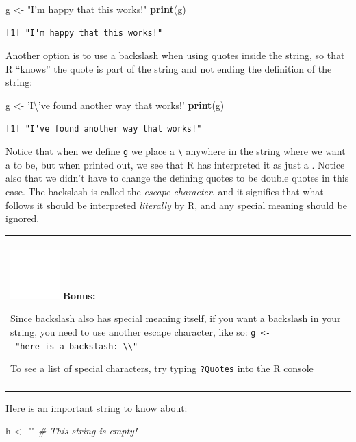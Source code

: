 \documentclass[
]{book}
\newenvironment{Shaded}{\begin{snugshade}}{\end{snugshade}}
\newcommand{\CharTok}[1]{\textcolor[rgb]{0.31,0.60,0.02}{#1}}
\newcommand{\CommentTok}[1]{\textcolor[rgb]{0.56,0.35,0.01}{\textit{#1}}}
\newcommand{\KeywordTok}[1]{\textcolor[rgb]{0.13,0.29,0.53}{\textbf{#1}}}
\newcommand{\NormalTok}[1]{#1}
\newcommand{\StringTok}[1]{\textcolor[rgb]{0.31,0.60,0.02}{#1}}
\newenvironment{bonus}
{
  \begin{center}
  \begin{tabular}{|>{\columncolor{bonus}\color{white}}p{0.9\textwidth}|}\hline\\
  \includegraphics[scale=0.1]{src/images/sun-fill-invert.png}
  \textbf{Bonus:}
}
{\\\\\hline
  \end{tabular}
  \end{center}
}
\begin{document}
\begin{Shaded}
\begin{Highlighting}[]
\NormalTok{g <-}\StringTok{ "I'm happy that this works!"}
\KeywordTok{print}\NormalTok{(g)}
\end{Highlighting}
\end{Shaded}

\begin{verbatim}
[1] "I'm happy that this works!"
\end{verbatim}

Another option is to use a backslash when using quotes inside the string, so that R ``knows'' the quote is part of the string and not ending the definition of the string:

\begin{Shaded}
\begin{Highlighting}[]
\NormalTok{g <-}\StringTok{ 'I}\CharTok{\textbackslash{}'}\StringTok{ve found another way that works!'}
\KeywordTok{print}\NormalTok{(g)}
\end{Highlighting}
\end{Shaded}

\begin{verbatim}
[1] "I've found another way that works!"
\end{verbatim}

Notice that when we define \texttt{g} we place a \texttt{\textbackslash{}\textquotesingle{}} anywhere in the string where we want a \texttt{\textquotesingle{}} to be, but when printed out, we see that R has interpreted it as just a \texttt{\textquotesingle{}}.
Notice also that we didn't have to change the defining quotes to be double quotes in this case.
The backslash is called the \emph{escape character}, and it signifies that what follows it should be interpreted \emph{literally} by R, and any special meaning should be ignored.

\begin{bonus}
Since backslash also has special meaning itself, if you want a backslash
in your string, you need to use another escape character, like so:
\texttt{g\ \textless{}-\ "here\ is\ a\ backslash:\ \textbackslash{}\textbackslash{}"}

To see a list of special characters, try typing \texttt{?Quotes} into
the R console
\end{bonus}

Here is an important string to know about:

\begin{Shaded}
\begin{Highlighting}[]
\NormalTok{h <-}\StringTok{ ""}              \CommentTok{# This string is empty!}
\end{Highlighting}
\end{Shaded}
\end{document}
